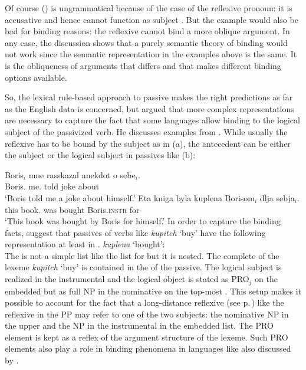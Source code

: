 \documentclass[output=paper
 	        ,biblatex
                ,babelshorthands
                ,newtxmath
                ,draftmode
                ,colorlinks, citecolor=brown
]{langscibook}
\begin{document}
\noindent
Of course () is ungrammatical because of the case of the reflexive pronoun: it is accusative
and hence cannot function as subject \citep[]{Brame77}. But the example would also be bad for binding reasons: the
reflexive cannot bind a more oblique argument. In any case, the discussion shows that a purely
semantic theory of binding would not work since the semantic representation in the examples above is
the same. It is the obliqueness of arguments that differs and that makes different binding options available.

So, the lexical rule-based approach to passive makes the right predictions as far as the English
data is concerned, but \citet{Perlmutter1984} argued that more complex representations are necessary to capture the
fact that some languages allow binding to the logical subject of the passivized verb. He discusses
examples from . While usually the reflexive has to be bound by the subject as in
(a), the antecedent can be either the subject or the logical subject in passives like (b):

\eal
\label{binding:russian-pass}
\ex  
\gll Boris$_i$    mne      rasskazal anekdot o sebe$_i$.\\
     Boris.\nom{} me.\dat{} told      joke    about \self\\
\glt `Boris told me a joke about himself.'
\ex
\gll Eta kniga byla kuplena Borisom$_{i}$ dlja sebja$_{i}$.  \\
     this book.\nom{} was bought Boris.\textsc{instr} for \self  \\
\glt `This book was bought by Boris for himself.'
\zl
In order to capture the binding facts, \citet{MS98a} suggest that passives of verbs like
\emph{kupitch} `buy' have the following representation at least in .
\ea
\emph{kuplena} `bought':\\
\z
The \argstl is not a simple list like the list for  but it is nested. The complete \argstl of
the lexeme \emph{kupitch} `buy' is contained in the \argstl of the passive. The logical subject is
realized in the instrumental and the logical object is stated as PRO$_j$ on the embedded \argst but
as full NP in the nominative on the top-most \argstl. This setup makes it possible to account for
the fact that a long-distance reflexive (see p.\,\pageref{page-long-distance-reflexives}) like the
reflexive in the PP may refer to one of the two subjects: the nominative NP in the upper \argstl and
the NP in the instrumental in the embedded list. The PRO element is kept as a reflex of the
argument structure of the lexeme. Such PRO elements also play a role in binding phenomena in languages
like  also discussed by \citeauthor{MS98a}.
\end{document}
